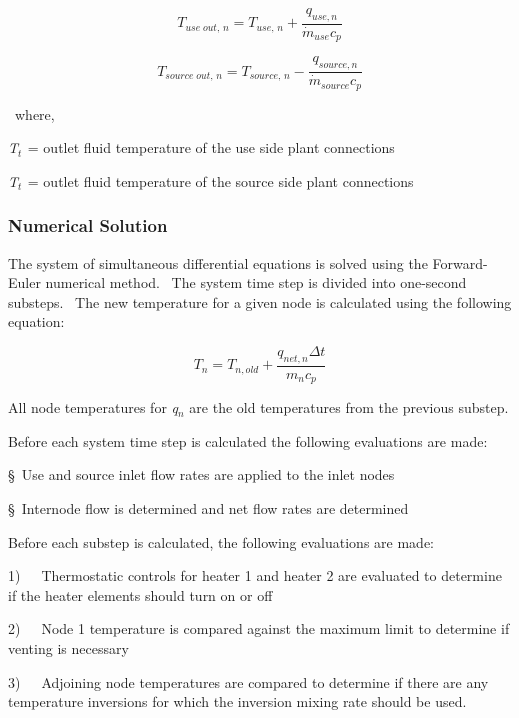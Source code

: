 \begin{equation}
{T_{use\;out,\,n}} = {T_{use,\,n}} + \frac{{{q_{use,n}}}}{{{{\dot m}_{use}}{c_p}}}
\end{equation}

\begin{equation}
{T_{source\;out,\,n}} = {T_{source,\,n}} - \frac{{{q_{source,n}}}}{{{{\dot m}_{source}}{c_p}}}
\end{equation}

~where,

\emph{T\(_{t}\)}\(_{ }\) = outlet fluid temperature of the use side plant connections

\emph{T\(_{t}\)}\(_{ }\) = outlet fluid temperature of the source side plant connections

\subsubsection{Numerical Solution}\label{numerical-solution}

The system of simultaneous differential equations is solved using the Forward-Euler numerical method.~ The system time step is divided into one-second substeps.~ The new temperature for a given node is calculated using the following equation:

\begin{equation}
{T_n} = {T_{n,old}} + \frac{{{q_{net,n}}\Delta t}}{{{m_n}{c_p}}}
\end{equation}

All node temperatures for \emph{q\(_{n}\)} are the old temperatures from the previous substep.

Before each system time step is calculated the following evaluations are made:

§~Use and source inlet flow rates are applied to the inlet nodes

§~Internode flow is determined and net flow rates are determined

Before each substep is calculated, the following evaluations are made:

1)~~~Thermostatic controls for heater 1 and heater 2 are evaluated to determine if the heater elements should turn on or off

2)~~~Node 1 temperature is compared against the maximum limit to determine if venting is necessary

3)~~~Adjoining node temperatures are compared to determine if there are any temperature inversions for which the inversion mixing rate should be used.


